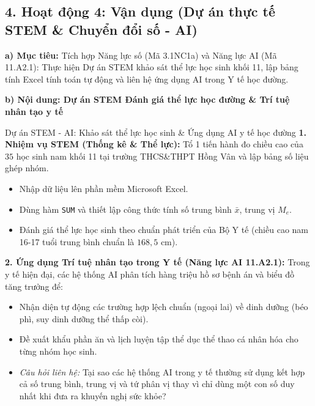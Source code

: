 \documentclass[12pt, a4paper]{article}
\begin{document}
\subsection*{4. Hoạt động 4: Vận dụng (Dự án thực tế STEM \& Chuyển đổi số - AI)}

\noindent \textbf{a) Mục tiêu:}
Tích hợp Năng lực số (Mã 3.1NC1a) và Năng lực AI (Mã 11.A2.1): Thực hiện Dự án STEM khảo sát thể lực học sinh khối 11, lập bảng tính Excel tính toán tự động và liên hệ ứng dụng AI trong Y tế học đường.

\noindent \textbf{b) Nội dung: Dự án STEM Đánh giá thể lực học đường \& Trí tuệ nhân tạo y tế}
\begin{aibox}{Dự án STEM - AI: Khảo sát thể lực học sinh \& Ứng dụng AI y tế học đường}
\textbf{1. Nhiệm vụ STEM (Thống kê & Thể lực):}
Tổ 1 tiến hành đo chiều cao của $35$ học sinh nam khối 11 tại trường THCS\&THPT Hồng Vân và lập bảng số liệu ghép nhóm.
\begin{itemize}[leftmargin=0.6cm]
    \item Nhập dữ liệu lên phần mềm Microsoft Excel.
    \item Dùng hàm \texttt{SUM} và thiết lập công thức tính số trung bình $\bar{x}$, trung vị $M_e$.
    \item Đánh giá thể lực học sinh theo chuẩn phát triển của Bộ Y tế (chiều cao nam 16-17 tuổi trung bình chuẩn là $168{,}5$ cm).
\end{itemize}
\textbf{2. Ứng dụng Trí tuệ nhân tạo trong Y tế (Năng lực AI 11.A2.1):}
Trong y tế hiện đại, các hệ thống AI phân tích hàng triệu hồ sơ bệnh án và biểu đồ tăng trưởng để:
\begin{itemize}[leftmargin=0.6cm]
    \item Nhận diện tự động các trường hợp lệch chuẩn (ngoại lai) về dinh dưỡng (béo phì, suy dinh dưỡng thể thấp còi).
    \item Đề xuất khẩu phần ăn và lịch luyện tập thể dục thể thao cá nhân hóa cho từng nhóm học sinh.
    \item \textit{Câu hỏi liên hệ:} Tại sao các hệ thống AI trong y tế thường sử dụng kết hợp cả số trung bình, trung vị và tứ phân vị thay vì chỉ dùng một con số duy nhất khi đưa ra khuyến nghị sức khỏe?
\end{itemize}
\end{aibox}
\end{document}

